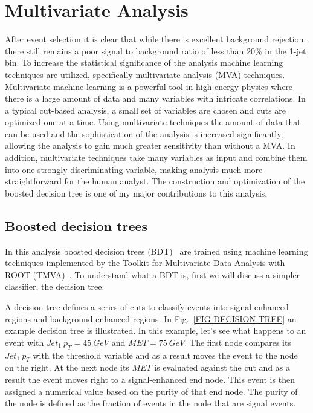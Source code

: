 \chapter{Multivariate Analysis}
\label{SECTION-MVA}
After event selection it is clear that while there is excellent background rejection, there still remains a poor signal to background ratio of less than 20\% in the 1-jet bin. To increase the statistical significance of the analysis machine learning techniques are utilized, specifically multivariate analysis (MVA) techniques. Multivariate machine learning is a powerful tool in high energy physics where there is a large amount of data and many variables with intricate correlations. In a typical cut-based analysis, a small set of variables are chosen and cuts are optimized one at a time. Using multivariate techniques the amount of data that can be used and the sophistication of the analysis is increased significantly, allowing the analysis to gain much greater sensitivity than without a MVA. In addition, multivariate techniques take many variables as input and combine them into one strongly discriminating variable, making analysis much more straightforward for the human analyst. The construction and optimization of the boosted decision tree is one of my major contributions to this analysis.
\section{Boosted decision trees}
\label{SECTION-BDT}

In this analysis boosted decision trees (BDT)~\cite{BDT} are trained using machine learning techniques implemented by the Toolkit for Multivariate Data Analysis with ROOT (TMVA)~\cite{TMVA}. To understand what a BDT is, first we will discuss a simpler classifier, the decision tree.

A decision tree defines a series of cuts to classify events into signal enhanced regions and background enhanced regions. In Fig.~\ref{FIG-DECISION-TREE} an example decision tree is illustrated. In this example, let's see what happens to an event with $Jet_{1}\ p_T = 45\ GeV$ and $MET = 75\ GeV$. The first node compares its $Jet_{1}\ p_T$ with the threshold variable and as a result moves the event to the node on the right. At the next node its $MET$ is evaluated against the cut and as a result the event moves right to a signal-enhanced end node. This event is then assigned a numerical value based on the purity of that end node. The purity of the node is defined as the fraction of events in the node that are signal events.

